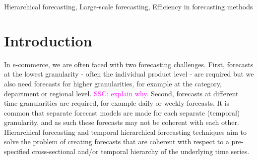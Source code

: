 \documentclass[preprint, 3p, times, twocolumn]{elsarticle}
\newcommand{\ssc}[1]{\textcolor{magenta}{SSC: #1.}}
\begin{document}
\begin{frontmatter}
\begin{abstract}
  In our tests on the public M5 dataset, our sparse hierarchical loss function performs up to 10\% better compared to the baseline loss function. Next, we implement our sparse hierarchical loss function within an existing gradient boosting-based forecasting model at bol.com, a large European e-commerce platform. \ssc{Describe the forecasting problem at bol in one sentence} Unfortunately, in this setting our sparse hierarchical loss resulted in a slightly worse forecasting performance as measured by RMSE of about 1\% at the product level, as compared to the the baseline model. \ssc{We need a positive message here, e.g., that you outperform the TL baseline on the highest sales buckets, which are very important from a commercial perspective}
  
\end{abstract}

\begin{keyword}
  Hierarchical forecasting, Large-scale forecasting, Efficiency in forecasting methods
\end{keyword}

\end{frontmatter}

\section{Introduction} \label{sec:intro}
In e-commerce, we are often faced with two forecasting challenges. First, forecasts at the lowest granularity - often the individual product level - are required but we also need forecasts for higher granularities, for example at the category, department or regional level. \ssc{explain why} Second, forecasts at different time granularities are required, for example daily or weekly forecasts. It is common that separate forecast models are made for each separate (temporal) granularity, and as such these forecasts may not be coherent with each other. Hierarchical forecasting \cite{hyndman_optimal_2011} and temporal hierarchical forecasting techniques \cite{athanasopoulos_forecasting_2017,rangapuram_coherent_2023,theodosiou_forecasting_2021} aim to solve the problem of creating forecasts that are coherent with respect to a pre-specified cross-sectional and/or temporal hierarchy of the underlying time series. 

\end{document}
